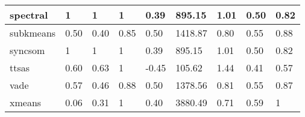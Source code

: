 \begin{table}[H]
\begin{tabular}{|l|l|l|l|l|l|l|l|l|}
\hline
spectral & 1 & 1 & 1 & 0.39 & 895.15 & 1.01 & 0.50 & 0.82 \\
\hline
subkmeans & 0.50 & 0.40 & 0.85 & 0.50 & 1418.87 & 0.80 & 0.55 & 0.88 \\
\hline
syncsom & 1 & 1 & 1 & 0.39 & 895.15 & 1.01 & 0.50 & 0.82 \\
\hline
ttsas & 0.60 & 0.63 & 1 & -0.45 & 105.62 & 1.44 & 0.41 & 0.57 \\
\hline
vade & 0.57 & 0.46 & 0.88 & 0.50 & 1378.56 & 0.81 & 0.55 & 0.87 \\
\hline
xmeans & 0.06 & 0.31 & 1 & 0.40 & 3880.49 & 0.71 & 0.59 & 1 \\
\hline
\end{tabular}
\end{table}